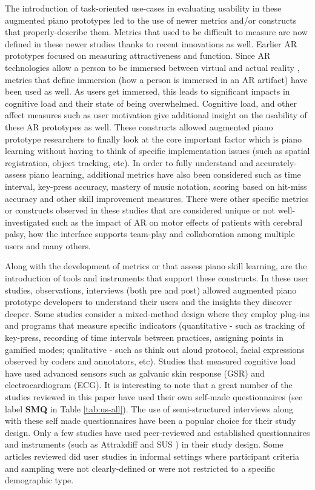\documentclass[sigconf, screen, review]{acmart}
\begin{document}
The introduction of task-oriented use-cases in evaluating usability in these augmented piano prototypes led to the use of newer metrics and/or constructs that properly-describe them. Metrics that used to be difficult to measure are now defined in these newer studies thanks to recent innovations as well. Earlier AR prototypes focused on measuring attractiveness and function. Since AR technologies allow a person to be immersed between virtual and actual reality \cite{milgram1995augmented}, metrics that define immersion (how a person is immersed in an AR artifact) have been used as well. As users get immersed, this leads to significant impacts in cognitive load and their state of being overwhelmed. Cognitive load, and other affect measures such as user motivation give additional insight on the usability of these AR prototypes as well. These constructs allowed augmented piano prototype researchers to finally look at the core important factor which is piano learning without having to think of specific implementation issues (such as spatial registration, object tracking, etc). In order to fully understand and accurately-assess piano learning, additional metrics have also been considered such as time interval, key-press accuracy, mastery of music notation, scoring based on hit-miss accuracy and other skill improvement measures. There were other specific metrics or constructs observed in these studies that are considered unique or not well-investigated such as the impact of AR on motor effects of patients with cerebral palsy, how the interface supports team-play and collaboration among multiple users and many others. 

Along with the development of metrics or that assess piano skill learning, are the introduction of tools and instruments that support these constructs. In these user studies, observations, interviews (both pre and post) allowed augmented piano prototype developers to understand their users and the insights they discover deeper. Some studies consider a mixed-method design where they employ plug-ins and programs that measure specific indicators (quantitative - such as tracking of key-press, recording of time intervals between practices, assigning points in gamified modes; qualitative - such as think out aloud protocol, facial expressions observed by coders and annotators, etc). Studies that measured cognitive load have used advanced sensors such as galvanic skin response (GSR) and electrocardiogram (ECG). It is interesting to note that a great number of the studies reviewed in this paper have used their own self-made questionnaires (see label \textbf{SMQ} in Table \ref{tab:us-all}). The use of semi-structured interviews along with these self made questionnaires have been a popular choice for their study design. Only a few studies have used peer-reviewed and established questionnaires and instruments (such as Attrakdiff \cite{hassenzahl2003attrakdiff} and SUS \cite{lewis2009factor})  in their study design. Some articles reviewed did user studies in informal settings where participant criteria and sampling were not clearly-defined or were not restricted to a specific demographic type. 
\end{document}
